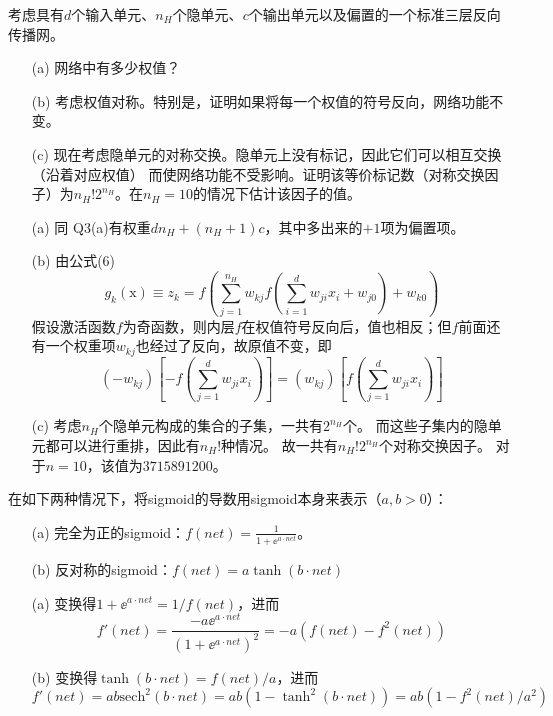 \documentclass[reportComp]{thesis}
\begin{document}
\begin{question}[\textsection 6 Q8]
考虑具有$d$个输入单元、$n_H$个隐单元、$c$个输出单元以及偏置的一个标准三层反向传播网。
\begin{itemize}
	\item [(a)] 网络中有多少权值？
	\item [(b)] 考虑权值对称。特别是，证明如果将每一个权值的符号反向，网络功能不变。
	\item [(c)] 现在考虑隐单元的对称交换。隐单元上没有标记，因此它们可以相互交换（沿着对应权值）
	而使网络功能不受影响。证明该等价标记数（对称交换因子）为$n_H!2^{n_H}$。在$n_H=10$的情况下估计该因子的值。
\end{itemize}
\end{question}
\begin{answer}
\begin{itemize}
	\item [(a)] 同 Q3(a)有权重$dn_H+(n_H+1)c$，其中多出来的$+1$项为偏置项。
	\item [(b)] 由公式(6)
	\[g_{k}(\mathrm{x}) \equiv z_{k}=f\left(\sum_{j=1}^{n_{H}} w_{k j} f\left(\sum_{i=1}^{d} w_{j i} x_{i}+w_{j 0}\right)+w_{k 0}\right)\]
	假设激活函数$f$为奇函数，则内层$f$在权值符号反向后，值也相反；但$f$前面还有一个权重项$w_{kj}$也经过了反向，故原值不变，即
	\[\left(-w_{k j}\right)\left[-f\left(\sum_{j=1}^{d} w_{j i} x_{i}\right)\right]=\left(w_{k j}\right)\left[f\left(\sum_{j=1}^{d} w_{j i} x_{i}\right)\right]\]
	\item [(c)] 考虑$n_H$个隐单元构成的集合的子集，一共有$2^{n_H}$个。
	而这些子集内的隐单元都可以进行重排，因此有$n_H!$种情况。
	故一共有$n_H!2^{n_H}$个对称交换因子。
	对于$n=10$，该值为$3715891200$。
\end{itemize}
\end{answer}

\begin{question}[\textsection 6 Q10]
在如下两种情况下，将sigmoid的导数用sigmoid本身来表示（$a,b>0$）：
\begin{itemize}
	\item [(a)] 完全为正的sigmoid：$f(net)=\frac{1}{1+\ee^{a\cdot net}}$。
	\item [(b)] 反对称的sigmoid：$f(net)=a\tanh(b\cdot net)$
\end{itemize}
\end{question}
\begin{answer}
\begin{itemize}
	\item [(a)] 变换得$1+\ee^{a\cdot net}=1/f(net)$，进而
	\[f'(net)=\frac{-a\ee^{a\cdot net}}{(1+\ee^{a\cdot net})^2}=-a(f(net)-f^2(net))\]
	\item [(b)] 变换得$\tanh(b\cdot net)=f(net)/a$，进而
	\[f'(net)=ab\mathrm{sech}^2(b\cdot net)=ab(1-\tanh^2(b\cdot net))=ab(1-f^2(net)/a^2)\]
\end{itemize}
\end{answer}
\end{document}
